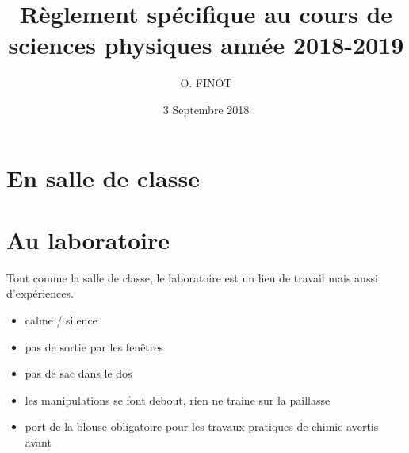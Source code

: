 \documentclass[a4paper, 11pt]{article}
\author{O. FINOT}
\date{3 Septembre 2018}
\title{Règlement spécifique au cours de sciences physiques année 2018-2019}
\begin{document}
	\section{En salle de classe}
	
	\begin{itemize}
		
	\end{itemize}
	
	\section{Au laboratoire}
	
	Tout comme la salle de classe, le laboratoire est un lieu de travail mais aussi d'expériences.
	
	\begin{itemize}
		\item calme / silence
		\item pas de sortie par les fenêtres
		\item pas de sac dans le dos
		\item les manipulations se font debout, rien ne traine sur la paillasse
		\item port de la blouse obligatoire pour les travaux pratiques de chimie avertis avant
	\end{itemize}
\end{document}
